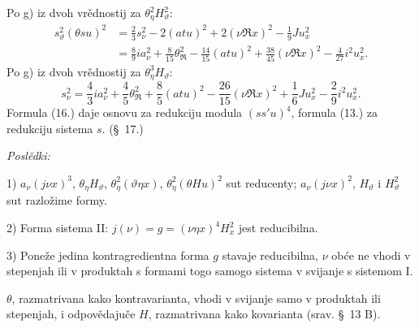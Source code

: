 \documentclass[11pt]{article}
\newcommand{\R}{\mathfrak R}
\begin{document}
\endgroup
Po \mbox{g)} iz dvoh vrědnostij za $\theta_\eta^2H_\vartheta^2$:
\[
\tag{15}
\begin{aligned}
s_\vartheta^2(\theta su)^2
&=\frac23s_\nu^2-2(atu)^2+2(\nu\R x)^2-\frac19Ju_x^2\\
&=\frac89ia_\nu^2+\frac8{15}\theta_\R^2-\frac{14}{15}(atu)^2+\frac{38}{45}(\nu\R x)^2-\frac4{27}i^2u_x^2.
\end{aligned}
\]
Po \mbox{g)} iz dvoh vrědnostij za $\theta_\eta^3H_\vartheta$:
\[
\tag{16}
s_\nu^2=\frac43ia_\nu^2+\frac45\theta_\R^2+\frac85(atu)^2-\frac{26}{15}(\nu\R x)^2+\frac16Ju_x^2-\frac29i^2u_x^2.
\]
Formula (16.) daje osnovu za redukciju modula $(ss'u)^4$, formula (13.) za redukciju sistema $s$. (\S\ 17.)

\noindent\textit{Poslědki:}

1) $a_\nu(j\nu x)^3$, $\theta_\eta H_\vartheta$, $\theta_\eta^2(\vartheta\eta x)$, $\theta_\eta^2(\theta Hu)^2$ sut reducenty; $a_\nu(j\nu x)^2$, $H_\vartheta$ i $H_\vartheta^2$ sut razložime formy.

2) Forma sistema II: $j(\nu)=g=(\nu\eta x)^4H_x^2$ jest reducibilna.

3) Poneže jedina kontragredientna forma $g$ stavaje reducibilna, $\nu$ obće ne vhodi v stepenjah ili v produktah s formami togo samogo sistema v svijanje s sistemom I.

$\theta$, razmatrivana kako kontravarianta, vhodi v svijanje samo v produktah ili stepenjah, i odpovědajuče $H$, razmatrivana kako kovarianta (srav. \S\ 13 B).
\end{document}
